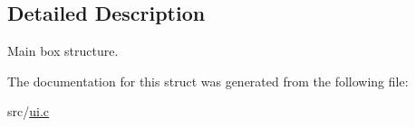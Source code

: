 \subsection{Detailed Description}
Main box structure. 

The documentation for this struct was generated from the following file\+:\begin{DoxyCompactItemize}
\item 
src/\hyperlink{ui_8c}{ui.\+c}\end{DoxyCompactItemize}
